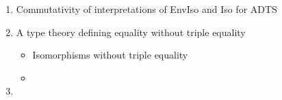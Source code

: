 \documentclass{scrartcl}
\begin{document}
\begin{enumerate}
  \item{Commutativity of interpretations of EnvIso and Iso for ADTS}
  \item{A type theory defining equality without triple equality}
  \begin{itemize}
    \item{Isomorphisms without triple equality}
    \item{}
  \end{itemize}
  \item{}
\end{enumerate}
\end{document}

